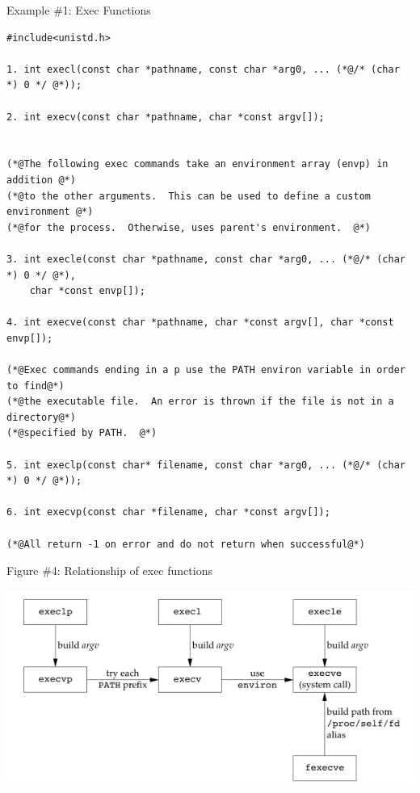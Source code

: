 \documentclass[12pt]{extarticle}
\newenvironment{myindentpar}[1]%
 {\begin{list}{}%
         {\setlength{\leftmargin}{#1}}%
         \item[]%
 }
 {\end{list}}
\begin{document}
\begin{myindentpar}{5mm}
    \begin{center}
        Example \#1: Exec Functions
    \end{center}
\begin{lstlisting}[frame=single]
#include<unistd.h>

1. int execl(const char *pathname, const char *arg0, ... (*@/* (char *) 0 */ @*));

2. int execv(const char *pathname, char *const argv[]);


(*@The following exec commands take an environment array (envp) in addition @*)
(*@to the other arguments.  This can be used to define a custom environment @*)
(*@for the process.  Otherwise, uses parent's environment.  @*)

3. int execle(const char *pathname, const char *arg0, ... (*@/* (char *) 0 */ @*), 
    char *const envp[]);

4. int execve(const char *pathname, char *const argv[], char *const envp[]);

(*@Exec commands ending in a p use the PATH environ variable in order to find@*)
(*@the executable file.  An error is thrown if the file is not in a directory@*)
(*@specified by PATH.  @*)

5. int execlp(const char* filename, const char *arg0, ... (*@/* (char *) 0 */ @*));

6. int execvp(const char *filename, char *const argv[]);

(*@All return -1 on error and do not return when successful@*)
\end{lstlisting}

    \begin{center}
        Figure \#4: Relationship of exec functions
    \end{center}
    \begin{center}
        \includegraphics{relationship.png}
    \end{center}

\end{myindentpar}
    
\end{document}
